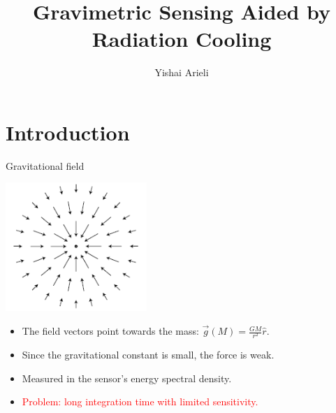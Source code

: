 \documentclass{beamer}
\title[Gravimetric Sensing Aided by Radiation Cooling]{Gravimetric Sensing Aided by Radiation Cooling}
\author[Yishai Arieli]{Yishai Arieli}
\begin{document}
	\typesetFrontSlides

\section{Introduction}



\begin{frame}{\hypertarget{frame:Gravitational field}{Gravitational field}}
	\begin{center}		
		\includegraphics[width=0.4\textwidth,keepaspectratio]{gravity.png}
    \end{center}
	\begin{itemize}
		\item The field vectors point towards the mass: $\overrightarrow{g}(M) = \frac{GM}{r^2}\hat{r}$.
		\item Since the gravitational constant is small, the force is weak.
		\item Measured in the sensor’s energy spectral density.

		\item \textcolor{red}{Problem: long integration time  with limited sensitivity.}
		\end{itemize}
\end{frame}
\end{document}
